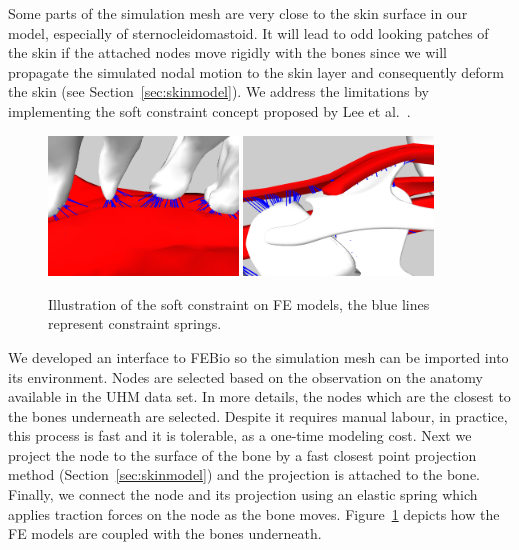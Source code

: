 Some parts of the simulation mesh are very close to the skin surface in our model, especially of sternocleidomastoid. It will lead to odd looking patches of the skin if the attached nodes move rigidly with the bones since we will propagate the simulated nodal motion to the skin layer and consequently deform the skin (see Section~\ref{sec:skinmodel}). We address the limitations by implementing the soft constraint concept proposed by Lee et al.~\cite{Lee:2009:CBM}.
\begin{figure}
\begin{center}
\includegraphics[width=0.45\textwidth]{vriphys/integrationsample}
\includegraphics[width=0.45\textwidth]{vriphys/collision}
\caption{\label{fig:integration}
Illustration of the soft constraint on FE models, the blue lines represent constraint springs.}
\end{center}
\end{figure}
We developed an interface to FEBio so the simulation mesh can be imported into its environment. Nodes are selected based on the observation on the anatomy available in the UHM data set. In more details, the nodes which are the closest to the bones underneath are selected. Despite it requires manual labour, in practice, this process is fast and it is tolerable, as a one-time modeling cost. Next we project the node to the surface of the bone by a fast closest point projection method (Section~\ref{sec:skinmodel}) and the projection is attached to the bone. Finally, we connect the node and its projection using an elastic spring which applies traction forces on the node as the bone moves. Figure~\ref{fig:integration} depicts how the FE models are coupled with the bones underneath.

